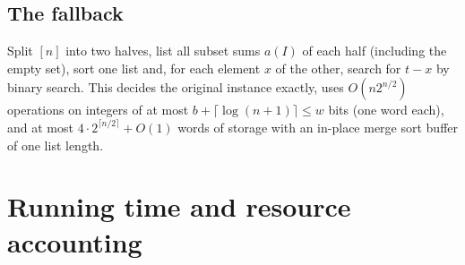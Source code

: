 \documentclass[11pt]{article}
\theoremstyle{definition}
\newcommand{\ceil}[1]{\lceil #1\rceil}
\begin{document}
\subsection{The fallback}\label{sec:fallback}
Split $[n]$ into two halves, list all subset sums $a(I)$ of each half (including the empty set), sort one list and,
for each element $x$ of the other, search for $t-x$ by binary search. This decides the original instance exactly,
uses $O(n2^{n/2})$ operations on integers of at most $b+\ceil{\log(n+1)}\le w$ bits (one word each), and at most
$4\cdot2^{\ceil{n/2}}+O(1)$ words of storage with an in-place merge sort buffer of one list length.
\section{Running time and resource accounting}\label{sec:time}
\end{document}

